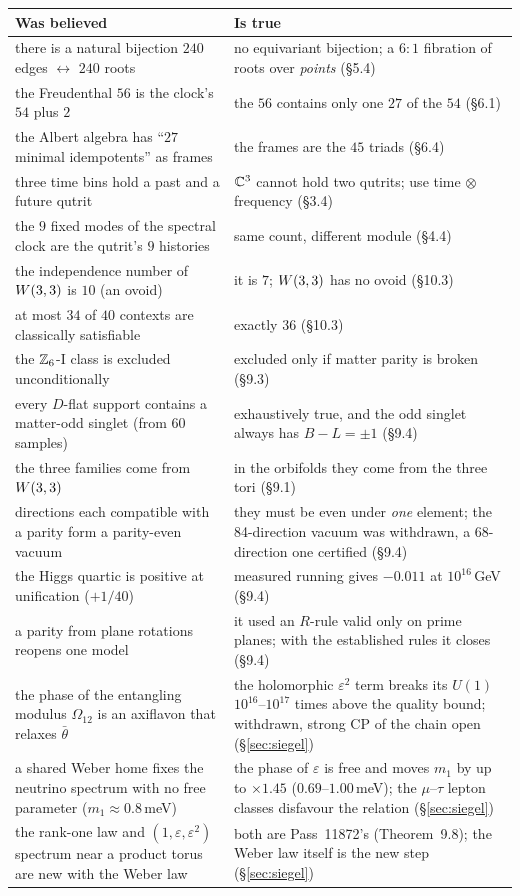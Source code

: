 \begin{center}
\small
\renewcommand{\arraystretch}{1.22}
\begin{tabularx}{\textwidth}{@{}Xp{6.2cm}@{}}
\toprule
\textbf{Was believed} & \textbf{Is true} \\
\midrule
there is a natural bijection $240$ edges $\leftrightarrow$ $240$ roots & no equivariant bijection; a $6{:}1$ fibration of roots over \emph{points} (\S5.4)\\
the Freudenthal $56$ is the clock's $54$ plus $2$ & the $56$ contains only one $27$ of the $54$ (\S6.1)\\
the Albert algebra has ``$27$ minimal idempotents'' as frames & the frames are the $45$ triads (\S6.4)\\
three time bins hold a past and a future qutrit & $\mathbb{C}^3$ cannot hold two qutrits; use time $\otimes$ frequency (\S3.4)\\
the $9$ fixed modes of the spectral clock are the qutrit's $9$ histories & same count, different module (\S4.4)\\
the independence number of $W(3,3)$ is $10$ (an ovoid) & it is $7$; $W(3,3)$ has no ovoid (\S10.3)\\
at most $34$ of $40$ contexts are classically satisfiable & exactly $36$ (\S10.3)\\
the $\mathbb{Z}_6$-I class is excluded unconditionally & excluded only if matter parity is broken (\S9.3)\\
every $D$-flat support contains a matter-odd singlet (from $60$ samples) & exhaustively true, and the odd singlet always has $B-L=\pm1$ (\S9.4)\\
the three families come from $W(3,3)$ & in the orbifolds they come from the three tori (\S9.1)\\
directions each compatible with a parity form a parity-even vacuum & they must be even under \emph{one} element; the 84-direction vacuum was withdrawn, a 68-direction one certified (\S9.4)\\
the Higgs quartic is positive at unification ($+1/40$) & measured running gives $-0.011$ at $10^{16}$\,GeV (\S9.4)\\
a parity from plane rotations reopens one model & it used an $R$-rule valid only on prime planes; with the established rules it closes (\S9.4)\\
the phase of the entangling modulus $\Omega_{12}$ is an axiflavon that relaxes $\bar\theta$ & the holomorphic $\varepsilon^2$ term breaks its $U(1)$ $10^{16}$--$10^{17}$ times above the quality bound; withdrawn, strong CP of the chain open (\S\ref{sec:siegel})\\
a shared Weber home fixes the neutrino spectrum with no free parameter ($m_1\approx0.8$\,meV) & the phase of $\varepsilon$ is free and moves $m_1$ by up to $\times1.45$ ($0.69$--$1.00$\,meV); the $\mu$--$\tau$ lepton classes disfavour the relation (\S\ref{sec:siegel})\\
the rank-one law and $(1,\varepsilon,\varepsilon^2)$ spectrum near a product torus are new with the Weber law & both are Pass~11872's (Theorem~9.8); the Weber law itself is the new step (\S\ref{sec:siegel})\\
\bottomrule
\end{tabularx}
\end{center}

